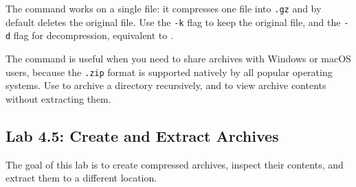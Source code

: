 The  command works on a single file: it compresses one file into \texttt{.gz} and by default deletes the original file. Use the \texttt{-k} flag to keep the original file, and the \texttt{-d} flag for decompression, equivalent to .

The  command is useful when you need to share archives with Windows or macOS users, because the \texttt{.zip} format is supported natively by all popular operating systems. Use  to archive a directory recursively, and  to view archive contents without extracting them.

\subsection*{Lab 4.5: Create and Extract Archives}

The goal of this lab is to create compressed archives, inspect their contents, and extract them to a different location.

